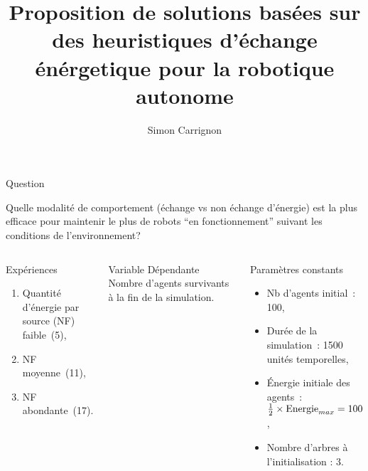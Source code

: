 \documentclass[8pt,handout]{beamer}
\author[]{Simon Carrignon}
\institute[]{
École~Pratique~des~Hautes~Études, Laboratoire de Cognition~Humaine~et~ARTificielle

\pgfdeclareimage[height=0.5cm]{ephe}{logo_ephe_large.jpg} %
\pgfuseimage{ephe} \hfill \pgfdeclareimage[height=0.5cm]{chart}{logo-120px.png} %
\pgfuseimage{chart}}
\title[]{Proposition de solutions bas\'{e}es sur des heuristiques d'\'{e}change \'{e}n\'{e}rgetique pour la robotique autonome }
\begin{document}
\begin{frame}{}
\small

\begin{alertblock}{Question}
 
 Quelle modalité de comportement (échange vs non échange d'énergie) est la plus efficace pour maintenir le plus de robots ``en fonctionnement'' suivant les conditions de l'environnement? 
\end{alertblock}
\begin{columns}



\end{columns}

\begin{columns}[t] 
\centering
{}
\begin{block}{Expériences}
\begin{enumerate}[ Exp I -]
  \item Quantité d'énergie par source (NF) faible~(5), 
  \item NF moyenne~(11), 
  \item NF abondante~(17). %
\end{enumerate}
\end{block}
\begin{block}{Variable Dépendante } Nombre d'agents survivants à la fin de la simulation.\end{block}



\begin{block}{Paramètres constants}
\begin{itemize}
 \item Nb d'agents initial : 100,
 \item Durée de la simulation : 1500 unités temporelles,
 \item Énergie initiale des agents : ${1\over{2}} \times{\mbox{Energie}_{max}}=100$,
 \item Nombre d'arbres à l'initialisation : 3.

\end{itemize}
\end{block}




\end{columns}
\end{frame}
\end{document}
